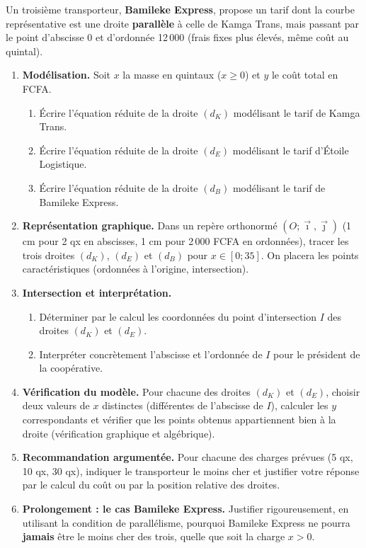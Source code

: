\documentclass[11pt]{article}
\newcounter{popsec}
\newcounter{popsub}
\newcommand{\courssub}[1]{%
  \stepcounter{popsub}%
  \par\vspace{9pt}\noindent{\popxbold\fontsize{11.5}{13}\selectfont\color{popink}{\color{poporange}\thepopsec.\thepopsub}\hspace{6pt}#1}\par\nopagebreak\vspace{4pt}
}
\begin{document}
Un troisième transporteur, \textbf{Bamileke Express}, propose un tarif dont la courbe représentative est une droite \textbf{parallèle} à celle de Kamga Trans, mais passant par le point d'abscisse 0 et d'ordonnée 12\,000 (frais fixes plus élevés, même coût au quintal).

\courssub{Consignes}
\begin{enumerate}
    \item \textbf{Modélisation.} Soit $x$ la masse en quintaux ($x \ge 0$) et $y$ le coût total en FCFA.
    \begin{enumerate}
        \item Écrire l'équation réduite de la droite $(d_K)$ modélisant le tarif de Kamga Trans.
        \item Écrire l'équation réduite de la droite $(d_E)$ modélisant le tarif d'Étoile Logistique.
        \item Écrire l'équation réduite de la droite $(d_B)$ modélisant le tarif de Bamileke Express.
    \end{enumerate}
    \item \textbf{Représentation graphique.} Dans un repère orthonormé $(O; \vec{\imath}, \vec{\jmath})$ (1 cm pour 2 qx en abscisses, 1 cm pour 2\,000 FCFA en ordonnées), tracer les trois droites $(d_K)$, $(d_E)$ et $(d_B)$ pour $x \in [0 ; 35]$. On placera les points caractéristiques (ordonnées à l'origine, intersection).
    \item \textbf{Intersection et interprétation.}
    \begin{enumerate}
        \item Déterminer par le calcul les coordonnées du point d'intersection $I$ des droites $(d_K)$ et $(d_E)$.
        \item Interpréter concrètement l'abscisse et l'ordonnée de $I$ pour le président de la coopérative.
    \end{enumerate}
    \item \textbf{Vérification du modèle.} Pour chacune des droites $(d_K)$ et $(d_E)$, choisir deux valeurs de $x$ distinctes (différentes de l'abscisse de $I$), calculer les $y$ correspondants et vérifier que les points obtenus appartiennent bien à la droite (vérification graphique et algébrique).
    \item \textbf{Recommandation argumentée.} Pour chacune des charges prévues (5 qx, 10 qx, 30 qx), indiquer le transporteur le moins cher et justifier votre réponse par le calcul du coût ou par la position relative des droites.
    \item \textbf{Prolongement : le cas Bamileke Express.} Justifier rigoureusement, en utilisant la condition de parallélisme, pourquoi Bamileke Express ne pourra \textbf{jamais} être le moins cher des trois, quelle que soit la charge $x > 0$.
\end{enumerate}
\end{document}
